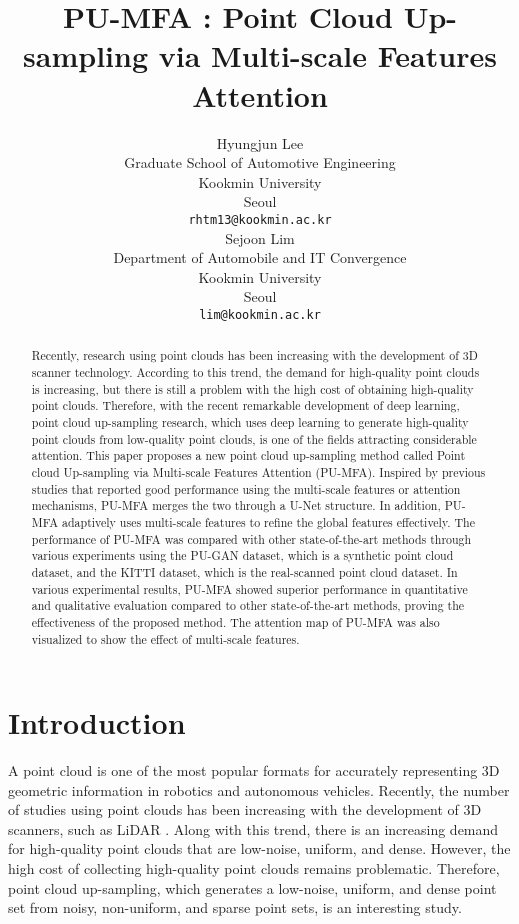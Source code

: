 \documentclass{article}
\title{PU-MFA : Point Cloud Up-sampling via Multi-scale Features Attention}
\author{
  Hyungjun Lee\\
  Graduate School of Automotive Engineering \\
  Kookmin University \\
  Seoul\\
  \texttt{rhtm13@kookmin.ac.kr} \\
\And
   Sejoon Lim  \\
  Department of Automobile and IT Convergence \\
  Kookmin University \\
  Seoul\\
  \texttt{lim@kookmin.ac.kr} \\
}
\begin{document}
\maketitle


\begin{abstract}
\quad Recently, research using point clouds has been increasing with the development of 3D scanner technology. According to this trend, the demand for high-quality point clouds is increasing, but there is still a problem with the high cost of obtaining high-quality point clouds.  Therefore, with the recent remarkable development of deep learning, point cloud up-sampling research, which uses deep learning to generate high-quality point clouds from low-quality point clouds, is one of the fields attracting considerable attention. This paper proposes a new point cloud up-sampling method called Point cloud Up-sampling via Multi-scale Features Attention (PU-MFA). Inspired by previous studies that reported good performance using the multi-scale features or attention mechanisms, PU-MFA merges the two through a U-Net structure. In addition, PU-MFA adaptively uses multi-scale features to refine the global features effectively. The performance of PU-MFA was compared with other state-of-the-art methods through various experiments using the PU-GAN dataset, which is a synthetic point cloud dataset, and the KITTI dataset, which is the real-scanned point cloud dataset. In various experimental results, PU-MFA showed superior performance in quantitative and qualitative evaluation compared to other state-of-the-art methods, proving the effectiveness of the proposed method. The attention map of PU-MFA was also visualized to show the effect of multi-scale features.
\end{abstract}




\section{Introduction}
\label{sec:introduction}
\quad A point cloud is one of the most popular formats for accurately representing 3D geometric information in robotics and autonomous vehicles. Recently, the number of studies using point clouds has been increasing with the development of 3D scanners, such as LiDAR \cite{koide2019portable,lim2022single}. Along with this trend, there is an increasing demand for high-quality point clouds that are low-noise, uniform, and dense. However, the high cost of collecting high-quality point clouds remains problematic. Therefore, point cloud up-sampling, which generates a low-noise, uniform, and dense point set from noisy, non-uniform, and sparse point sets, is an interesting study.
\end{document}
